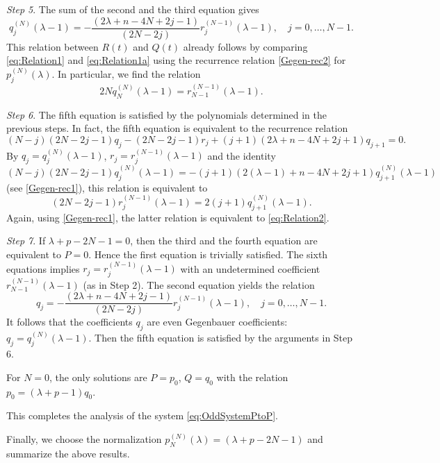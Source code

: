 \documentclass[a4paper,12pt,reqno]{amsart}
\numberwithin{theorem}{subsection}
\numberwithin{equation}{section}
\begin{document}
{\em Step 5}. The sum of the second and the third equation gives
\begin{equation}\label{eq:Relation2}
   q_j^{(N)}(\lambda\!-\!1) = -\frac{(2\lambda\!+\!n\!-\!4N\!+\!2j\!-\!1)}{(2N\!-\!2j)}
   r^{(N-1)}_{j}(\lambda\!-\!1), \quad j=0,\dots, N-1.
\end{equation}
This relation between $R(t)$ and $Q(t)$ already follows by comparing
\eqref{eq:Relation1} and \eqref{eq:Relation1a} using the recurrence relation
\eqref{Gegen-rec2} for $p_j^{(N)}(\lambda)$. In particular, we find the
relation
$$
   2N q_N^{(N)}(\lambda\!-\!1) = r_{N-1}^{(N-1)}(\lambda\!-\!1).
$$

{\em Step 6}. The fifth equation is satisfied by the polynomials determined in
the previous steps. In fact, the fifth equation is equivalent to the recurrence
relation
\begin{equation*}
   (N\!-\!j)(2N\!-\!2j\!-\!1) q_j - (2N\!-\!2j\!-\!1)r_j +
   (j\!+\!1)(2\lambda\!+\!n\!-\!4N\!+\!2j\!+\!1) q_{j+1} = 0.
\end{equation*}
By $q_j = q_j^{(N)}(\lambda\!-\!1)$, $r_j = r^{(N-1)}_j(\lambda\!-\!1)$ and the
identity
$$
  (N\!-\!j)(2N\!-\!2j\!-\!1) q_j^{(N)}(\lambda\!-\!1) = -(j\!+\!1)(2(\lambda\!-\!1)\!+\!n\!-\!4N\!+\!2j\!+\!1)
  q_{j+1}^{(N)}(\lambda\!-\!1)
$$
(see \eqref{Gegen-rec1}), this relation is equivalent to
$$
   (2N\!-\!2j\!-\!1) r_j^{(N-1)}(\lambda\!-\!1) = 2(j\!+\!1) q_{j+1}^{(N)}(\lambda\!-\!1).
$$
Again, using \eqref{Gegen-rec1}, the latter relation is equivalent to
\eqref{eq:Relation2}.

{\em Step 7}. If $\lambda\!+\!p\!-\!2N\!-\!1=0$, then the third and the fourth
equation are equivalent to $P=0$. Hence the first equation is trivially
satisfied. The sixth equations implies $r_j=r_j^{(N-1)}(\lambda\!-\!1)$ with an
undetermined coefficient $r_{N-1}^{(N-1)}(\lambda\!-\!1)$ (as in Step 2). The
second equation yields the relation
$$
   q_j = -\frac{(2\lambda\!+\!n\!-\!4N\!+\!2j\!-\!1)}{(2N\!-\!2j)}
   r^{(N-1)}_{j}(\lambda\!-\!1), \quad j=0,\dots,N-1.
$$
It follows that the coefficients $q_j$ are even Gegenbauer coefficients: $q_j =
q_j^{(N)}(\lambda\!-\!1)$. Then the fifth equation is satisfied by the
arguments in Step 6.

For $N=0$, the only solutions are $P=p_0$, $Q=q_0$ with the relation $p_0 =
(\lambda+p-1) q_0$.

This completes the analysis of the system \eqref{eq:OddSystemPtoP}.

Finally, we choose the normalization $p_N^{(N)}(\lambda) =
(\lambda\!+\!p\!-\!2N\!-\!1)$ and summarize the above results.
\end{document}
